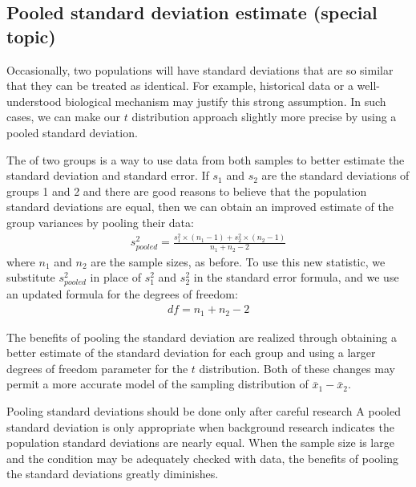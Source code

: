 \subsection{Pooled standard deviation estimate (special topic)}
\label{pooledStandardDeviations}

Occasionally, two populations will have standard deviations that are so similar that they can be treated as identical. For example, historical data or a well-understood biological mechanism may justify this strong assumption. In such cases, we can make our $t$ distribution approach slightly more precise by using a pooled standard deviation.

The  of two groups is a way to use data from both samples to better estimate the standard deviation and standard error. If $s_1^{}$ and $s_2^{}$ are the standard deviations of groups 1 and 2 and there are good reasons to believe that the population standard deviations are equal, then we can obtain an improved estimate of the group variances by pooling their data:
\begin{align*}
s_{pooled}^2 = \frac{s_1^2\times (n_1-1) + s_2^2\times (n_2-1)}{n_1 + n_2 - 2}
\end{align*}
where $n_1$ and $n_2$ are the sample sizes, as before. To use this new statistic, we substitute $s_{pooled}^2$ in place of $s_1^2$ and $s_2^2$ in the standard error formula, and we use an updated formula for the degrees of freedom:
\begin{align*}
df = n_1 + n_2 - 2
\end{align*}

The benefits of pooling the standard deviation are realized through obtaining a better estimate of the standard deviation for each group and using a larger degrees of freedom parameter for the $t$ distribution. Both of these changes may permit a more accurate model of the sampling distribution of $\bar{x}_1 - \bar{x}_2$.

\begin{caution}
{Pooling standard deviations should be done only after careful research}
{A pooled standard deviation is only appropriate when background research indicates the population standard deviations are nearly equal. When the sample size is large and the condition may be adequately checked with data, the benefits of pooling the standard deviations greatly diminishes.}
\end{caution}


\textB{\newpage}



